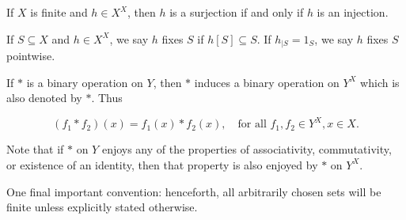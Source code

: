 If $X$ is finite and $h \in X^X$, then $h$ is a surjection if and only if $h$ is an injection.

If $S \subseteq X$ and $h \in X^X$, we say $h$ fixes $S$ if $h[S] \subseteq S$. If $h_{|S} = 1_S$, we say $h$ fixes $S$ pointwise.

If $*$ is a binary operation on $Y$, then $*$ induces a binary operation on $Y^X$ which is also denoted by $*$. Thus

$$(f_1 * f_2)(x) = f_1(x) * f_2(x), \quad \text{for all } f_1, f_2 \in Y^X, x \in X.$$

Note that if $*$ on $Y$ enjoys any of the properties of associativity, commutativity, or existence of an identity, then that property is also enjoyed by $*$ on $Y^X$.

One final important convention: henceforth, all arbitrarily chosen sets will be finite unless explicitly stated otherwise.
